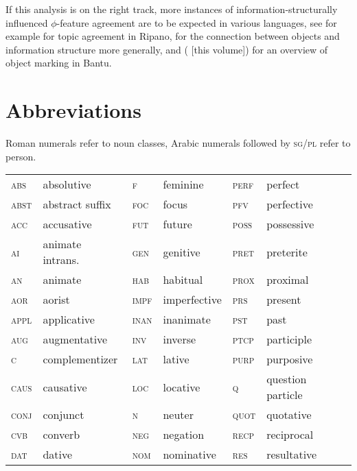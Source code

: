 \documentclass[output=paper
,modfonts
,nonflat]{langsci/langscibook}
\begin{document}
If this analysis is on the right track, more instances of information-structurally influenced $ \phi $-feature agreement are to be expected in various languages, see for example  for topic agreement in Ripano, \citet{Dalrymple_Nikolaeva2011} for the connection between objects and information structure more generally, and (\citealt{Van_der_Wal2015,chapters/07-van-der-wal} [this volume]) for an overview of object marking in Bantu.

\pagebreak\section*{Abbreviations}
Roman numerals refer to noun classes, Arabic numerals followed by \textsc{sg/pl} refer to person.
\begin{table}
	\begin{tabular}{@{}llllll@{}} 
	\textsc{abs} 	&	 absolutive 	&	\textsc{f} 	&	  feminine 	&	  \textsc{perf} 	&	   perfect 	\\
\textsc{abst} 	&	  abstract suffix 	&	  \textsc{foc} 	&	  focus	&	  \textsc{pfv} 	&	  perfective 	\\
\textsc{acc} 	&	  accusative 	&	  \textsc{fut} 	&	  future	&	  \textsc{poss}  	&	 possessive 	\\
\textsc{ai} 	&	  animate intrans. 	&	  \textsc{gen} 	&	  genitive  	&	  \textsc{pret} 	&	  preterite 	\\
\textsc{an} 	&	  animate 	&	  \textsc{hab} 	&	  habitual 	&	  \textsc{prox}  	&	 proximal 	\\
\textsc{aor} 	&	  aorist 	&	  \textsc{impf} 	&	  imperfective	&	  \textsc{prs} 	&	  present 	\\
\textsc{appl} 	&	  applicative 	&	  \textsc{inan} 	&	  inanimate	&	  \textsc{pst} 	&	  past 	\\
\textsc{aug} 	&	  augmentative 	&	  \textsc{inv} 	&	  inverse	&	  \textsc{ptcp} 	&	  participle 	\\
\textsc{c}	&	complementizer	&	  \textsc{lat} 	&	  lative 	&	  \textsc{purp}  	&	 purposive 	\\
\textsc{caus} 	&	  causative 	&	  \textsc{loc} 	&	  locative	&	\textsc{q}	&	question particle	\\
\textsc{conj} 	&	  conjunct 	&	  \textsc{n} 	&	  neuter 	&	  \textsc{quot} 	&	  quotative 	\\
\textsc{cvb} 	&	  converb 	&	  \textsc{neg} 	&	  negation 	&	\textsc{recp}	&	reciprocal	\\
\textsc{dat} 	&	  dative 	&	  \textsc{nom} 	&	  nominative 	&	  \textsc{res} 	&	  resultative 	\\

\end{tabular}
\end{table}
\end{document}
